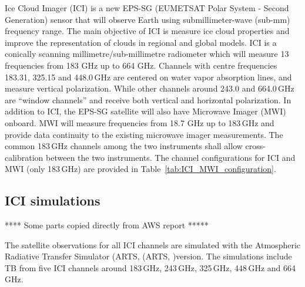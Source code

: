\documentclass[amt, manuscript]{copernicus}
\begin{document}
Ice Cloud Imager (ICI) is a new EPS-SG (EUMETSAT Polar System - Second Generation) sensor that will observe  Earth using submillimeter-wave (sub-mm) frequency range. The main objective of ICI is measure ice cloud properties and improve the representation of clouds in regional and global models. ICI is a conically scanning millimetre/sub-millimetre radiometer which will measure 13 frequencies from 183 GHz up to 664 GHz. Channels with centre frequencies 183.31, 325.15 and 448.0\,GHz are centered on water vapor absorption lines, and measure vertical polarization. While other channels around 243.0 and 664.0\,GHz are ``window channels'' and receive both vertical and horizontal polarization. 
In addition to ICI, the EPS-SG satellite will also have Microwave Imager (MWI) onboard. MWI will measure frequencies from 18.7 GHz up to 183\,GHz and provide data continuity to the existing microwave imager measurements. The common 183\,GHz channels among the two instruments shall allow cross-calibration between the two instruments. The channel configurations for ICI and MWI (only 183\,GHz) are provided in Table~\ref{tab:ICI_MWI_configuration}.

\subsection{ICI simulations}
\label{sec:arts_simulations}
%

**** Some parts copied directly from AWS report *****

The satellite observations for all ICI channels are simulated with the Atmospheric Radiative Transfer Simulator (ARTS, (ARTS, \citet{eriksson:arts2:11,buehler:artst:18})version. The simulations include TB from five ICI channels around 183\,GHz, 243\,GHz, 325\,GHz, 448\,GHz and 664\,GHz. 
\end{document}
